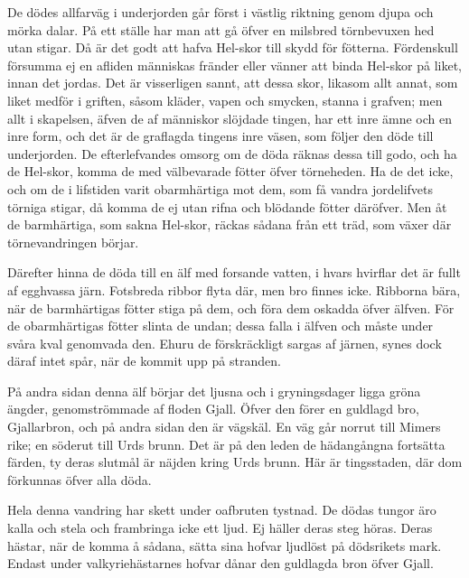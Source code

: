 De dödes allfarväg i underjorden går först i västlig riktning genom
djupa och mörka dalar. På ett ställe har man att gå öfver en milsbred
törnbevuxen hed utan stigar. Då är det godt att hafva Hel-skor till
skydd för fötterna. Fördenskull försumma ej en afliden människas fränder
eller vänner att binda Hel-skor på liket, innan det jordas. Det är
visserligen sannt, att dessa skor, likasom allt annat, som liket medför
i griften, såsom kläder, vapen och smycken, stanna i grafven; men allt i
skapelsen, äfven de af människor slöjdade tingen, har ett inre ämne och
en inre form, och det är de graflagda tingens inre väsen, som följer den
döde till underjorden. De efterlefvandes omsorg om de döda räknas dessa
till godo, och ha de Hel-skor, komma de med välbevarade fötter öfver
törneheden. Ha de det icke, och om de i lifstiden varit obarmhärtiga mot
dem, som få vandra jordelifvets törniga stigar, då komma de ej utan
rifna och blödande fötter däröfver. Men åt de barmhärtiga, som sakna
Hel-skor, räckas sådana från ett träd, som växer där törnevandringen
börjar.

Därefter hinna de döda till en älf med forsande vatten, i hvars hvirflar
det är fullt af egghvassa järn. Fotsbreda ribbor flyta där, men bro
finnes icke. Ribborna bära, när de barmhärtigas fötter stiga på dem, och
föra dem oskadda öfver älfven. För de obarmhärtigas fötter slinta de
undan; dessa falla i älfven och måste under svåra kval genomvada
\protect\hypertarget{lb1625905.xhtmlux5cux23start182}{}{}\protect\hypertarget{lb1625905.xhtmlux5cux23start182-a}{}{}\protect\hypertarget{lb1625905.xhtmlux5cux23start182-b}{}{}\protect\hypertarget{lb1625905.xhtmlux5cux23start182-c}{}{}\protect\hypertarget{lb1625905.xhtmlux5cux23start182-d}{}{}
den. Ehuru de förskräckligt sargas af järnen, synes dock däraf intet
spår, när de kommit upp på stranden.

På andra sidan denna älf börjar det ljusna och i gryningsdager ligga
gröna ängder, genomströmmade af floden Gjall. Öfver den förer en
guldlagd bro, Gjallarbron, och på andra sidan den är vägskäl. En väg går
norrut till Mimers rike; en söderut till Urds brunn. Det är på den leden
de hädangångna fortsätta färden, ty deras slutmål är näjden kring Urds
brunn. Här är tingsstaden, där dom förkunnas öfver alla döda.

Hela denna vandring har skett under oafbruten tystnad. De dödas tungor
äro kalla och stela och frambringa icke ett ljud. Ej häller deras steg
höras. Deras hästar, när de komma å sådana, sätta sina hofvar ljudlöst
på dödsrikets mark. Endast under valkyriehästarnes hofvar dånar den
guldlagda bron öfver Gjall.


